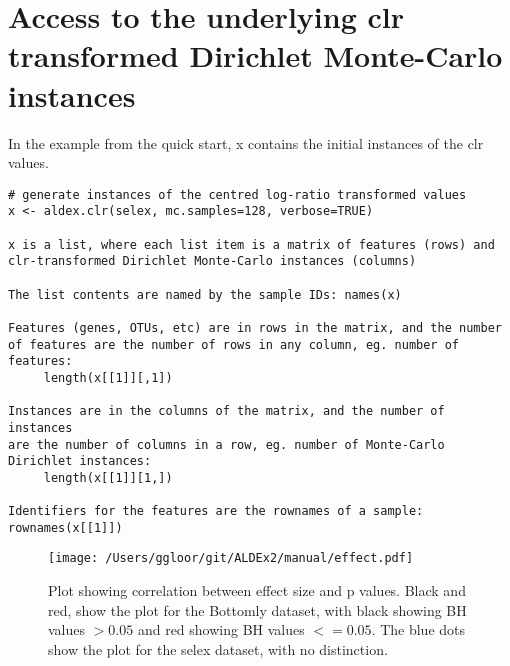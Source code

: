 \documentclass[11pt]{article}
\begin{document}
\section{Access to the underlying clr transformed Dirichlet Monte-Carlo instances}{\label{clr}
In the example from the quick start, x contains the initial instances of the clr values. 
\begin{verbatim}
# generate instances of the centred log-ratio transformed values
x <- aldex.clr(selex, mc.samples=128, verbose=TRUE)  

x is a list, where each list item is a matrix of features (rows) and 
clr-transformed Dirichlet Monte-Carlo instances (columns)

The list contents are named by the sample IDs: names(x)

Features (genes, OTUs, etc) are in rows in the matrix, and the number 
of features are the number of rows in any column, eg. number of features: 
     length(x[[1]][,1])
     
Instances are in the columns of the matrix, and the number of instances
are the number of columns in a row, eg. number of Monte-Carlo Dirichlet instances: 
     length(x[[1]][1,])
     
Identifiers for the features are the rownames of a sample: rownames(x[[1]])

\end{verbatim}

\newpage
\begin{wrapfigure}{R}[0mm]{0.4\textwidth}
\vspace{0cm}
\begin{center}
\texttt{[image: /Users/ggloor/git/ALDEx2/manual/effect.pdf]}
\caption{Plot showing correlation between effect size and p values. Black and red, show the plot for the Bottomly dataset, with black showing BH values $>0.05$ and red showing BH values $<= 0.05$. The blue dots show the plot for the selex dataset, with no distinction.}
\label{effect}
\end{center}\vspace{0cm}
\end{wrapfigure}

}
\end{document}
